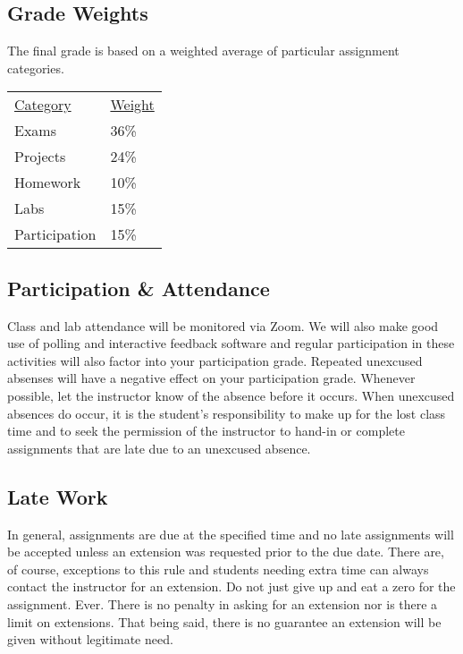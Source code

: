 \documentclass[10pt]{article}
\begin{document}
\subsection{Grade Weights}

The final grade is based on a weighted average of particular assignment categories.

\begin{center}
  \begin{tabular}{ll}
  \underline{Category} & \underline{Weight} \\
    Exams & 36\% \\ %
    Projects & 24\% \\ %
    Homework & 10\% \\ %
    Labs & 15\% \\ %
    Participation & 15\%
  \end{tabular}
\end{center}

\subsection{Participation \& Attendance}

Class and lab attendance will be monitored via Zoom. We will also make good use of polling and interactive feedback software and regular participation in these activities will also factor into your participation grade. Repeated unexcused absenses will have a negative effect on your participation grade. Whenever possible, let the instructor know of the absence before it occurs. When unexcused absences do occur, it is the student's responsibility to make up for the lost class time and to seek the permission of the instructor to hand-in or complete assignments that are late due to an unexcused absence.

\subsection{Late Work}

In general, assignments are due at the specified time and no late assignments will be accepted unless an extension was requested prior to the due date. There are, of course, exceptions to this rule and students needing extra time can always contact the instructor for an extension. Do not just give up and eat a zero for the assignment. Ever. There is no penalty in asking for an extension nor is there a limit on extensions.  That being said, there is no guarantee an extension will be given without legitimate need.
\end{document}
